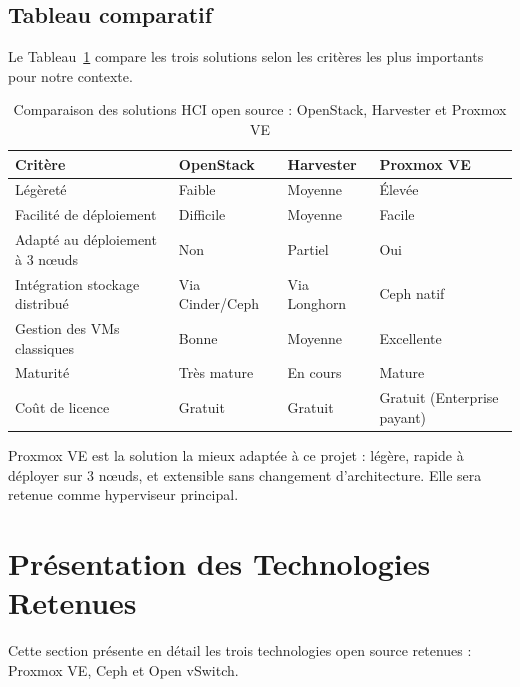 \subsection{Tableau comparatif}

\par Le Tableau~\ref{tab:comparatif-hci} compare les trois solutions selon les critères les plus importants pour notre contexte.\\

\begin{table}[H]
\centering
\caption{Comparaison des solutions HCI open source : OpenStack, Harvester et Proxmox VE}
\label{tab:comparatif-hci}
\begin{tabular}{|p{3.5cm}|p{2.5cm}|p{2.5cm}|p{3.5cm}|}
\hline
\textbf{Critère} & \textbf{OpenStack} & \textbf{Harvester} & \textbf{Proxmox VE} \\
\hline
Légèreté & Faible & Moyenne & Élevée \\
\hline
Facilité de déploiement & Difficile & Moyenne & Facile \\
\hline
Adapté au déploiement à 3 n\oe{}uds & Non & Partiel & Oui \\
\hline
Intégration stockage distribué & Via Cinder/Ceph & Via Longhorn & Ceph natif \\
\hline
Gestion des VMs classiques & Bonne & Moyenne & Excellente \\
\hline
Maturité & Très mature & En cours & Mature \\
\hline
Coût de licence & Gratuit & Gratuit & Gratuit (Enterprise payant) \\
\hline
\end{tabular}
\end{table}

\par Proxmox VE est la solution la mieux adaptée à ce projet : légère, rapide à déployer sur 3 n\oe{}uds, et extensible sans changement d'architecture. Elle sera retenue comme hyperviseur principal.\\

\section{Présentation des Technologies Retenues}

\par Cette section présente en détail les trois technologies open source retenues : Proxmox VE, Ceph et Open vSwitch.\\


